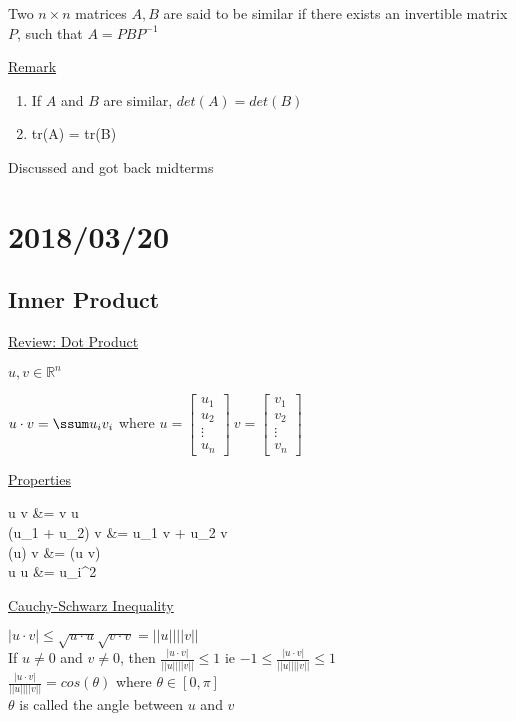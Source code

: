 \documentclass[12pt]{article}
\newcommand\m[1]{\begin{bmatrix}#1\end{bmatrix}}
\newcommand{\real}[0]{\mathbb{R}}
\newenvironment{block}[1][Label]{\underline{#1}\par}{}
\newenvironment{remark}{\block[Remark]}{\endblock}
\newcommand{\bbb}[1]{\left[#1\right]}
\newcommand{\abs}[1]{\left|#1\right|}
\newenvironment{eqn}{\equation\alignedat{3}}{\endalignedat\endequation}
\begin{document}
	Two $n \times n$ matrices $A, B$ are said to be similar if there exists an invertible matrix $P$, such that $A = PBP^{-1}$
	
	\begin{remark}
		\begin{enumerate}
			\item If $A$ and $B$ are similar, $det(A) = det(B)$
			\item tr(A) = tr(B)
		\end{enumerate}
	\end{remark}

	Discussed and got back midterms
	
	\section{2018/03/20}
	
	\subsection{Inner Product}
	
	\begin{block}[Review: Dot Product]
	$u, v \in \real^n$
	
	$u \cdot v = \ssum u_i v_i$ where $u = \m{u_1 \\ u_2 \\ \vdots \\ u_n} \ v = \m{v_1 \\ v_2 \\ \vdots \\ v_n}$
	
	\begin{block}[Properties]
		\begin{eqn}
			u \cdot v &= v \cdot u \\
			(u_1 + u_2) \cdot v &= u_1 \cdot v + u_2 \cdot v \\
			(\alpha u) \cdot v &= \alpha (u \cdot v) \\ 
			u \cdot u &= \ssum u_i^2 
		\end{eqn}
	\end{block}
	
	\end{block}

	\begin{block}[Cauchy-Schwarz Inequality]
		$\abs{u \cdot v} \le \sqrt{u \cdot u} \sqrt{v \cdot v} = \abs{\abs{u}} \abs{\abs{v}}$ \\ 
		If $u \ne 0$ and $v \ne 0$, then $\frac{\abs{u \cdot v}}{\abs{\abs{u}} \abs{\abs{v}}} \le 1$ \quad ie $-1 \le \frac{\abs{u \cdot v}}{\abs{\abs{u}} \abs{\abs{v}}} \le 1$ \\
		$\frac{\abs{u \cdot v}}{\abs{\abs{u}} \abs{\abs{v}}} = cos(\theta)$ where $\theta \in \bbb{0, \pi}$ \\
		$\theta$ is called the angle between $u$ and $v$
	\end{block}
	
\end{document}

